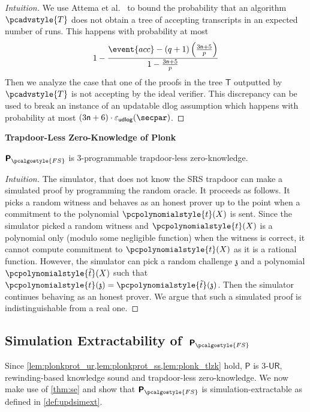 \documentclass[10pt]{llncs}
\newcommand{\pcvarstyle}[1]{\mathsf{#1}}
\newcommand{\p}[1]{\pcpolynomialstyle{#1}}
\newcommand{\numberofconstrains}{\pcvarstyle{n}}
\newcommand{\noofc}{\numberofconstrains}
\newcommand{\eps}{\varepsilon}
\newcommand{\fs}{\pcalgostyle{FS}}
\newcommand{\tree}{\pcvarstyle{T}}
\newcommand{\pcschemestyle}[1]{\bm{\mathsf{#1}}}
\newcommand{\plonkprot}{\pcschemestyle{P}}
\newcommand{\plonkprotfs}{\pcschemestyle{P}_\fs}
\newcommand{\chz}{\mathfrak{z}}
\newcommand{\tdv}{\pcadvstyle{T}}
\newcommand{\accProb}{\event{acc}}
\newcommand{\ur}[1]{{#1\text{-}\mathsf{UR}}}
\newcommand{\udlog}{\pcvarstyle{udlog}}
\newcommand{\epsid}{\eps_{\pcvarstyle{id}}}
\newcommand{\epsudlog}{\eps_\udlog}
\newcommand{\oursubsub}[1] {\smallskip\noindent\textbf{#1}}
\begin{document}
\begin{proof}[Intuition]
	We use Attema et al.~\cite[Proposition 2]{EPRINT:AttFehKlo21} to bound the probability that an algorithm $\tdv$ does not obtain a tree of accepting transcripts in an expected number of runs. This happens with probability at most
	\[
	1 - \frac{\accProb - (q + 1) \left(\frac{3 \noofc + 5}{p} \right)}{1 - \frac{3 \noofc + 5}{p}}
	\]
	Then we analyze the case that one of the proofs in the tree $\tree$ outputted by $\tdv$ is not accepting by the ideal verifier. This discrepancy can be used to break an instance of an updatable dlog assumption which happens with probability at most $(3 \noofc + 6)  \cdot \epsudlog (\secpar)$. %
\end{proof}


\oursubsub{Trapdoor-Less Zero-Knowledge of Plonk}
\begin{lemma}
	\label{lem:plonk_tlzk}
	$\plonkprotfs$ is 3-programmable trapdoor-less zero-knowledge.
\end{lemma}

\begin{proof}[Intuition]
	The simulator, that does not know the SRS trapdoor can make a simulated proof by programming the random oracle. It proceeds as follows. It picks a random witness and behaves as an honest prover up to the point when a commitment to the polynomial $\p{t}(X)$ is sent. Since the simulator picked a random witness and $\p{t}(X)$ is a polynomial only (modulo some negligible function) when the witness is correct, it cannot compute commitment to $\p{t}(X)$ as it is a rational function. However, the simulator can pick a random challenge $\chz$ and a polynomial $\p{\tilde{t}}(X)$ such that $\p{t} (\chz)  = \p{\tilde{t}} (\chz)$. Then the simulator continues behaving as an honest prover. We argue that such a simulated proof is indistinguishable from a real one.
\end{proof}

\subsection*{Simulation Extractability of~$\plonkprotfs$}
Since \cref{lem:plonkprot_ur,lem:plonkprot_ss,lem:plonk_tlzk} hold, $\plonkprot$ is $\ur{3}$,
rewinding-based knowledge sound and trapdoor-less zero-knowledge. We now make use of \cref{thm:se} and show that
$\plonkprot_\fs$ is simulation-extractable as defined in \cref{def:updsimext}.
\end{document}
